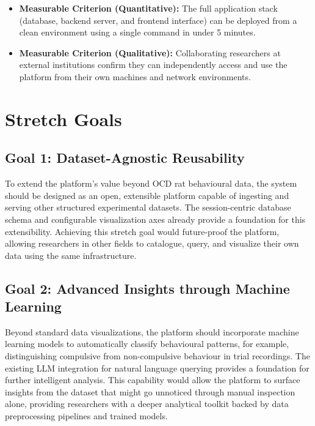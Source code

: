 \documentclass{article}
\begin{document}
  \begin{itemize}
    \item \textbf{Measurable Criterion (Quantitative):} The full application stack (database, backend server,
    and frontend interface) can be deployed from a clean environment using a single command in under 5 minutes.
    \item \textbf{Measurable Criterion (Qualitative):} Collaborating researchers at external institutions
    confirm they can independently access and use the platform from their own machines and network environments.
  \end{itemize}


\section{Stretch Goals}

  \subsection{Goal 1: Dataset-Agnostic Reusability}
  
  \par{To extend the platform's value beyond OCD rat behavioural data, the system should be designed as an
  open, extensible platform capable of ingesting and serving other structured experimental datasets. The
  session-centric database schema and configurable visualization axes already provide a foundation for this
  extensibility. Achieving this stretch goal would future-proof the platform, allowing researchers in other
  fields to catalogue, query, and visualize their own data using the same infrastructure.}

  \subsection{Goal 2: Advanced Insights through Machine Learning}
  
  \par{Beyond standard data visualizations, the platform should incorporate machine learning models to
  automatically classify behavioural patterns, for example, distinguishing compulsive from non-compulsive
  behaviour in trial recordings. The existing LLM integration for natural language querying provides a
  foundation for further intelligent analysis. This capability would allow the platform to surface insights
  from the dataset that might go unnoticed through manual inspection alone, providing researchers with a deeper
  analytical toolkit backed by data preprocessing pipelines and trained models.}
\end{document}
